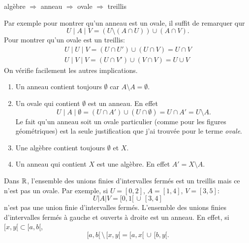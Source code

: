 \begin{propn}\label{prop:ImpTypesSyst}
  algèbre $\Rightarrow$ anneau $\Rightarrow$ ovale $\Rightarrow$ treillis
\end{propn}
\begin{demo}
Par exemple pour montrer qu'un anneau est un ovale, il suffit de remarquer qur
\begin{displaymath}
  U \mid A \mid V = (U \setminus (A \cap U)) \cup (A \cap V).
\end{displaymath}
Pour montrer qu'un ovale est un treillis:
\begin{align*}
  U \mid U \mid V = (U \cap U') \cup (U \cap V) = U \cap V \\
  U \mid V \mid V = (U \cap V') \cup (V \cap V) = U \cup V
\end{align*}
On vérifie facilement les autres implications.
\end{demo}

\begin{rems}
 \begin{enumerate}
  \item Un anneau contient toujours $\emptyset$ car $A \setminus A = \emptyset$.
  \item Un ovale qui contient $\emptyset$ est un anneau. En effet
    \begin{displaymath}
      U \mid A \mid \emptyset = (U \cap A')\cup (U \cap \emptyset) = U \cap A' = U \setminus A.
    \end{displaymath}
    Le fait qu'un anneau soit un ovale particulier (comme pour les figures géométriques) est la seule justification que j'ai trouvée pour le terme \emph{ovale}.
  \item Une algèbre contient toujours $\emptyset$ et $X$.
  \item Un anneau qui contient $X$ est une algèbre. En effet $A' = X \setminus A$.
 \end{enumerate}
\end{rems}
\begin{exples}
 Dans $\mathbb{R}$, l'ensemble des unions finies d'intervalles fermés est un treillis mais ce n'est pas un ovale. Par exemple, si $U = [0,2]$, $A=[1,4]$, $V = [3,5]$:
 \begin{displaymath}
  U|A|V = [0,1[ \, \cup \, [3,4]
 \end{displaymath}
n'est pas une union finie d'intervalles fermés.\newline
L'ensemble des unions finies d'intervalles fermés à gauche et ouverts à droite est un anneau. En effet, si $[x,y[ \subset [a,b[$,
\begin{displaymath}
 [a,b[ \,\setminus \, [x,y[ = [a,x[ \, \cup \, [b,y[.
\end{displaymath}
\end{exples}


